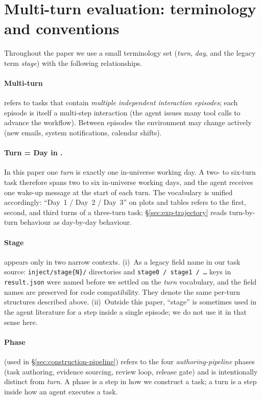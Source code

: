 
\appendix

\section{Multi-turn evaluation: terminology and conventions}
\label{app:terminology}

Throughout the paper we use a small terminology set (\emph{turn}, \emph{day}, and the legacy term \emph{stage}) with the following relationships.

\paragraph{Multi-turn} refers to tasks that contain \emph{multiple independent interaction episodes}; each episode is itself a multi-step interaction (the agent issues many tool calls to advance the workflow). Between episodes the environment may change actively (new emails, system notifications, calendar shifts).

\paragraph{Turn = Day in \bench{}.} In this paper one \emph{turn} is exactly one in-universe working day. A two- to six-turn task therefore spans two to six in-universe working days, and the agent receives one wake-up message at the start of each turn. The vocabulary is unified accordingly: ``Day~1 / Day~2 / Day~3'' on plots and tables refers to the first, second, and third turns of a three-turn task; \S\ref{sec:exp-trajectory} reads turn-by-turn behaviour as day-by-day behaviour.

\paragraph{Stage} appears only in two narrow contexts. (i)~As a legacy field name in our task source: \texttt{inject/stage\{N\}/} directories and \texttt{stage0 / stage1 / \ldots} keys in \texttt{result.json} were named before we settled on the \emph{turn} vocabulary, and the field names are preserved for code compatibility. They denote the same per-turn structures described above. (ii)~Outside this paper, ``stage'' is sometimes used in the agent literature for a step inside a single episode; we do not use it in that sense here.

\paragraph{Phase} (used in \S\ref{sec:construction-pipeline}) refers to the four \emph{authoring-pipeline} phases (task authoring, evidence sourcing, review loop, release gate) and is intentionally distinct from \emph{turn}. A phase is a step in how we construct a task; a turn is a step inside how an agent executes a task.

